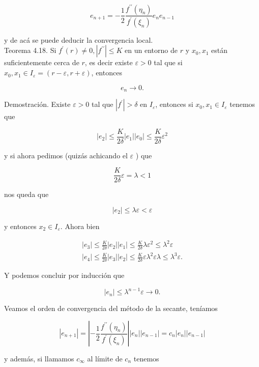 \documentclass[10pt]{article}
\begin{document}
$$
e_{n+1}=-\frac{1}{2} \frac{f^{\prime \prime}\left(\eta_{n}\right)}{f^{\prime}\left(\xi_{n}\right)} e_{n} e_{n-1}
$$

y de acá se puede deducir la convergencia local.\\
Teorema 4.18. Si $f^{\prime}(r) \neq 0,\left|f^{\prime \prime}\right| \leq K$ en un entorno de $r$ y $x_{0}, x_{1}$ están suficientemente cerca de $r$, es decir existe $\varepsilon>0$ tal que si $x_{0}, x_{1} \in I_{\varepsilon}=(r-\varepsilon, r+\varepsilon)$, entonces

$$
e_{n} \rightarrow 0 .
$$

Demostración. Existe $\varepsilon>0$ tal que $\left|f^{\prime}\right|>\delta$ en $I_{\varepsilon}$, entonces si $x_{0}, x_{1} \in I_{\varepsilon}$ tenemos que

$$
\left|e_{2}\right| \leq \frac{K}{2 \delta}\left|e_{1}\right|\left|e_{0}\right| \leq \frac{K}{2 \delta} \varepsilon^{2}
$$

y si ahora pedimos (quizás achicando el $\varepsilon$ ) que

$$
\frac{K}{2 \delta} \varepsilon=\lambda<1
$$

nos queda que

$$
\left|e_{2}\right| \leq \lambda \varepsilon<\varepsilon
$$

y entonces $x_{2} \in I_{\varepsilon}$. Ahora bien

$$
\begin{gathered}
\left|e_{3}\right| \leq \frac{K}{2 \delta}\left|e_{2}\right|\left|e_{1}\right| \leq \frac{K}{2 \delta} \lambda \varepsilon^{2} \leq \lambda^{2} \varepsilon \\
\left|e_{4}\right| \leq \frac{K}{2 \delta}\left|e_{3}\right|\left|e_{2}\right| \leq \frac{K}{2 \delta} \varepsilon \lambda^{2} \varepsilon \lambda \leq \lambda^{3} \varepsilon .
\end{gathered}
$$

Y podemos concluir por inducción que

$$
\left|e_{n}\right| \leq \lambda^{n-1} \varepsilon \rightarrow 0 .
$$

Veamos el orden de convergencia del método de la secante, teníamos

$$
\left|e_{n+1}\right|=\left|-\frac{1}{2} \frac{f^{\prime \prime}\left(\eta_{n}\right)}{f^{\prime}\left(\xi_{n}\right)}\right|\left|e_{n}\right|\left|e_{n-1}\right|=c_{n}\left|e_{n}\right|\left|e_{n-1}\right|
$$

y además, si llamamos $c_{\infty}$ al límite de $c_{n}$ tenemos
\end{document}
